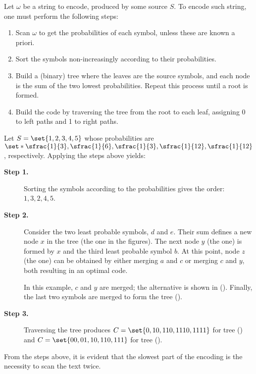 \documentclass{subfiles}
\begin{document}
    Let \(\omega\) be a string to encode, produced by some source \(S\).
    To encode such string, one must perform the following steps:
    \begin{enumerate}
        \item Scan \(\omega\) to get the probabilities of each symbol, 
            unless these are known a priori.

        \item Sort the symbols non-increasingly according to their probabilities.

        \item Build a (binary) tree where the leaves are the source symbols,
            and each node is the sum of the two lowest probabilities.
            Repeat this process until a root is formed.
            
        \item Build the code by traversing the tree from the root to each leaf,
            assigning 0 to left paths and 1 to right paths.
    \end{enumerate}

    \begin{example*}
        Let \(S = \set{1, 2, 3, 4, 5}\) whose probabilities are
            \(\set*{\sfrac{1}{3}, \sfrac{1}{6}, \sfrac{1}{3},
            \sfrac{1}{12}, \sfrac{1}{12}}\), respectively. 
        Applying the steps above yields:
        \begin{description}
            \item [\textbf{Step 1.}] 
                Sorting the symbols according to the probabilities gives the order: \(1, 3, 2, 4, 5\).

            \item [\textbf{Step 2.}] 
                Consider the two least probable symbols, \(d\) and \(e\).
                Their sum defines a new node \(x\) in the tree (the  one in the figures).
                The next node \(y\) (the  one) is formed by \(x\) 
                and the third least probable symbol \(b\).
                At this point, node \(z\) (the  one) can be obtained by 
                either merging \(a\) and \(c\) or merging \(c\) and \(y\),
                both resulting in an optimal code. 
                
                In this example, \(c\) and \(y\) are merged; the alternative is shown in ().
                Finally, the last two symbols are merged to form the tree ().
                
                
            \item [\textbf{Step 3.}] Traversing the tree produces 
                \(C = \set{0, 10, 110, 1110, 1111}\) for tree () and
                \(C = \set{00, 01, 10, 110, 111}\) for tree ().
        \end{description}   
    \end{example*}

    From the steps above, it is evident that the slowest part of the encoding
    is the necessity to scan the text twice.
\end{document}
